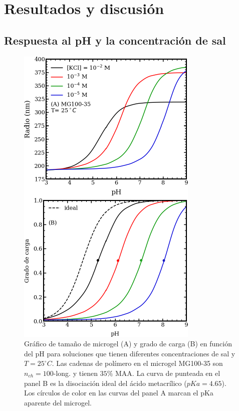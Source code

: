 \section{Resultados y discusi\'on}



\subsection{Respuesta al pH y la concentraci\'on de sal}\label{sec:gel:pH_salt}


\begin{figure}[!ht]
\centering
\includegraphics[width=0.55\linewidth]{Figures/graph-gel/R-pH.pdf}
\caption{Gr\'afico de tama\~no de microgel (A) y grado de carga (B) en funci\'on del pH para soluciones que tienen diferentes concentraciones de sal y $T=25 ^\circ C$.
	Las cadenas de pol\'imero en el microgel MG100-35 son $n_{ch}=100$-long. y tienen $35\% $ MAA.
	La curva de  punteada en el panel B es la disociaci\'on ideal del \'acido metacr\'ilico ($pKa=4.65$).
	Los c\'irculos de color en las curvas del panel A marcan el pKa aparente del microgel.}
\label{fig:gel:R-pH}
\end{figure}

